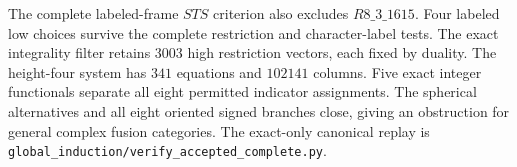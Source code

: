 The complete labeled-frame $STS$ criterion also excludes $R8\_3\_1615$.
Four labeled low choices survive the complete restriction and
character-label tests. The exact integrality filter retains $3003$
high restriction vectors, each fixed by duality. The height-four
system has $341$ equations and $102141$ columns.
Five exact integer functionals separate all eight permitted indicator
assignments. The spherical alternatives and all eight oriented signed
branches close, giving an obstruction for general complex fusion
categories. The exact-only canonical replay is
\texttt{global\_induction/verify\_accepted\_complete.py}.
